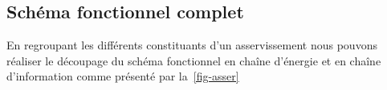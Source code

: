 \subsection{Schéma fonctionnel complet}
En regroupant les différents constituants d'un asservissement
nous pouvons réaliser le découpage du schéma fonctionnel en 
chaîne d'énergie et en chaîne d'information comme présenté par 
la~\cref{fig-asser}
\begin{landscape}
\vspace*{\fill}
\begin{center}
    
\end{center}
\vspace*{\fill}
\end{landscape}
